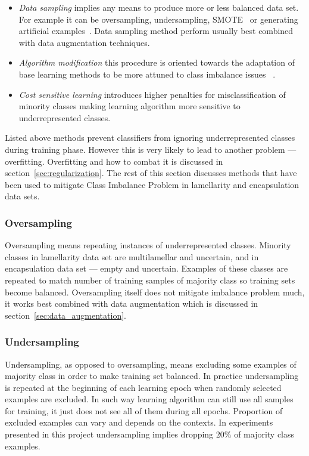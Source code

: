 \documentclass[a4paper, 11pt, table]{article}
\begin{document}
\begin{itemize}

\item \textit{Data sampling} implies any means to produce more or less balanced data set. For example it can be oversampling, undersampling, SMOTE~\cite{smote_chawla} or generating artificial examples~\cite{ishaq_synthetic}. Data sampling method perform usually best combined with data augmentation techniques.

\item \textit{Algorithm modification} this procedure is oriented towards the adaptation of base learning methods to be more attuned to class imbalance issues ~\cite{Zadrozny:2001:LMD:502512.502540}.

\item \textit{Cost sensitive learning} introduces higher penalties for misclassification of minority classes making learning algorithm more sensitive to underrepresented classes. 

\end{itemize}

Listed above methods prevent classifiers from ignoring underrepresented classes during training phase. However this is very likely to lead to another problem --- overfitting. Overfitting and how to combat it is discussed in section~\ref{sec:regularization}. The rest of this section discusses methods that have been used to mitigate Class Imbalance Problem in lamellarity and encapsulation data sets. 


\subsubsection{Oversampling}
Oversampling means repeating instances of underrepresented classes. Minority classes in lamellarity data set are multilamellar and uncertain, and in encapsulation data set --- empty and uncertain. Examples of these classes are repeated to match number of training samples of majority class so training sets become balanced. Oversampling itself does not mitigate imbalance problem much, it works best combined with data augmentation which is discussed in section~\ref{sec:data_augmentation}.

\subsubsection{Undersampling}
Undersampling, as opposed to oversampling, means excluding some examples of majority class in order to make training set balanced. In practice undersampling is repeated at the beginning of each learning epoch when randomly selected examples are excluded. In such way learning algorithm can still use all samples for training, it just does not see all of them during all epochs. Proportion of excluded examples can vary and depends on the contexts. In experiments presented in this project undersampling implies dropping $20\%$ of majority class examples. 
\end{document}
